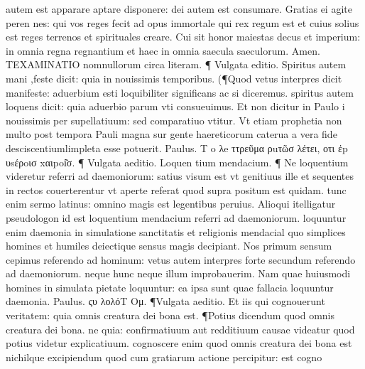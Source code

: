 \documentclass{article}
\begin{document}
\begin{pages}
autem est apparare aptare disponere: dei autem est consumare. Gratias ei agite peren nes: qui vos reges fecit ad opus immortale qui rex regum est et cuius solius est reges terrenos et spirituales creare. Cui sit honor maiestas decus et imperium: in omnia regna regnantium et haec in omnia saecula saeculorum. Amen.  \pend\pstart TEXAMINATIO nomnullorum circa literam. ¶ Vulgata editio. Spiritus autem mani ,feste dicit: quia in nouissimis temporibus. (¶Quod vetus interpres dicit manifeste: aduerbium esti loquibiliter significans ac si diceremus. spiritus autem loquens dicit: quia aduerbio parum vti consueuimus. Et non dicitur in Paulo i nouissimis per supellatiuum: sed comparatiuo vtitur. Vt etiam prophetia non multo post tempora Pauli magna sur gente haereticorum caterua a vera fide desciscentiumlimpleta esse potuerit. Paulus. T o λe ττρεῦμα ρuτῶσ λέτει, οτι ἐp υsέρoισ xαιpoi͂σ. ¶ Vulgata aeditio. Loquen tium mendacium. ¶ Ne loquentium videretur referri ad daemoniorum: satius visum est vt genitiuus ille et sequentes in rectos couerterentur vt aperte referat quod supra positum est quidam. tunc enim sermo latinus: omnino magis est legentibus peruius. Alioqui itelligatur pseudologon id est loquentium mendacium referri ad daemoniorum. loquuntur enim daemonia in simulatione sanctitatis et religionis mendacial quo simplices homines et humiles deiectique sensus magis decipiant. Nos primum sensum cepimus referendo ad hominum: vetus autem interpres forte secundum referendo ad daemoniorum. neque hunc neque illum improbauerim. Nam quae huiusmodi homines in simulata pietate loquuntur: ea ipsa sunt quae fallacia loquuntur daemonia. Paulus. ςυ λολόT Oμ.  ¶Vulgata aeditio. Et iis qui cognouerunt veritatem: quia omnis creatura dei bona est. ¶Potius dicendum quod omnis creatura dei bona. ne quia: confirmatiuum aut redditiuum causae videatur quod potius videtur explicatiuum. cognoscere enim quod omnis creatura dei bona est nichilque excipiendum quod cum gratiarum actione percipitur: est cogno\pend

\end{pages}
\end{document}
